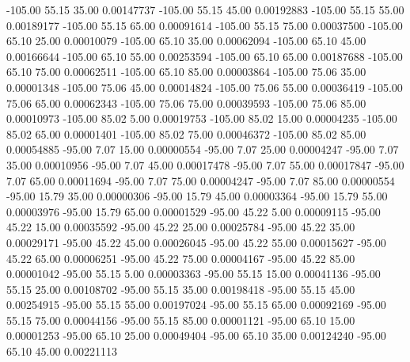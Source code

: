    -105.00     55.15     35.00     0.00147737
   -105.00     55.15     45.00     0.00192883
   -105.00     55.15     55.00     0.00189177
   -105.00     55.15     65.00     0.00091614
   -105.00     55.15     75.00     0.00037500
   -105.00     65.10     25.00     0.00010079
   -105.00     65.10     35.00     0.00062094
   -105.00     65.10     45.00     0.00166644
   -105.00     65.10     55.00     0.00253594
   -105.00     65.10     65.00     0.00187688
   -105.00     65.10     75.00     0.00062511
   -105.00     65.10     85.00     0.00003864
   -105.00     75.06     35.00     0.00001348
   -105.00     75.06     45.00     0.00014824
   -105.00     75.06     55.00     0.00036419
   -105.00     75.06     65.00     0.00062343
   -105.00     75.06     75.00     0.00039593
   -105.00     75.06     85.00     0.00010973
   -105.00     85.02      5.00     0.00019753
   -105.00     85.02     15.00     0.00004235
   -105.00     85.02     65.00     0.00001401
   -105.00     85.02     75.00     0.00046372
   -105.00     85.02     85.00     0.00054885
    -95.00      7.07     15.00     0.00000554
    -95.00      7.07     25.00     0.00004247
    -95.00      7.07     35.00     0.00010956
    -95.00      7.07     45.00     0.00017478
    -95.00      7.07     55.00     0.00017847
    -95.00      7.07     65.00     0.00011694
    -95.00      7.07     75.00     0.00004247
    -95.00      7.07     85.00     0.00000554
    -95.00     15.79     35.00     0.00000306
    -95.00     15.79     45.00     0.00003364
    -95.00     15.79     55.00     0.00003976
    -95.00     15.79     65.00     0.00001529
    -95.00     45.22      5.00     0.00009115
    -95.00     45.22     15.00     0.00035592
    -95.00     45.22     25.00     0.00025784
    -95.00     45.22     35.00     0.00029171
    -95.00     45.22     45.00     0.00026045
    -95.00     45.22     55.00     0.00015627
    -95.00     45.22     65.00     0.00006251
    -95.00     45.22     75.00     0.00004167
    -95.00     45.22     85.00     0.00001042
    -95.00     55.15      5.00     0.00003363
    -95.00     55.15     15.00     0.00041136
    -95.00     55.15     25.00     0.00108702
    -95.00     55.15     35.00     0.00198418
    -95.00     55.15     45.00     0.00254915
    -95.00     55.15     55.00     0.00197024
    -95.00     55.15     65.00     0.00092169
    -95.00     55.15     75.00     0.00044156
    -95.00     55.15     85.00     0.00001121
    -95.00     65.10     15.00     0.00001253
    -95.00     65.10     25.00     0.00049404
    -95.00     65.10     35.00     0.00124240
    -95.00     65.10     45.00     0.00221113
